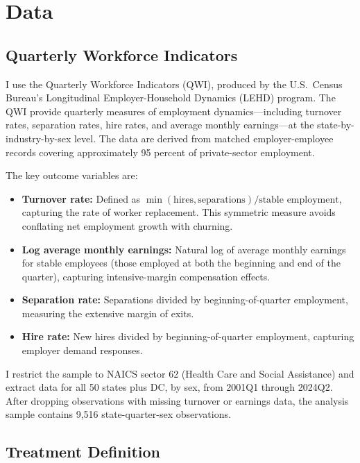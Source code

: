 \documentclass[12pt]{article}
\begin{document}
\section{Data}\label{sec:data}

\subsection{Quarterly Workforce Indicators}

I use the Quarterly Workforce Indicators (QWI), produced by the U.S.\ Census Bureau's Longitudinal Employer-Household Dynamics (LEHD) program. The QWI provide quarterly measures of employment dynamics---including turnover rates, separation rates, hire rates, and average monthly earnings---at the state-by-industry-by-sex level. The data are derived from matched employer-employee records covering approximately 95 percent of private-sector employment.

The key outcome variables are:

\begin{itemize}
\item \textbf{Turnover rate:} Defined as $\min(\text{hires}, \text{separations}) / \text{stable employment}$, capturing the rate of worker replacement. This symmetric measure avoids conflating net employment growth with churning.
\item \textbf{Log average monthly earnings:} Natural log of average monthly earnings for stable employees (those employed at both the beginning and end of the quarter), capturing intensive-margin compensation effects.
\item \textbf{Separation rate:} Separations divided by beginning-of-quarter employment, measuring the extensive margin of exits.
\item \textbf{Hire rate:} New hires divided by beginning-of-quarter employment, capturing employer demand responses.
\end{itemize}

I restrict the sample to NAICS sector 62 (Health Care and Social Assistance) and extract data for all 50 states plus DC, by sex, from 2001Q1 through 2024Q2. After dropping observations with missing turnover or earnings data, the analysis sample contains 9,516 state-quarter-sex observations.

\subsection{Treatment Definition}
\end{document}
